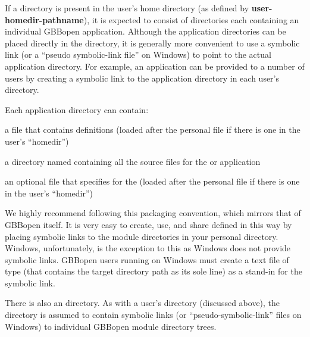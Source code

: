 \documentclass[10pt,twoside,english,pdftex]{article}
\begin{document}
If a  directory is present in the user's home directory
(as defined by \textbf{user-homedir-pathname}), it is expected to consist of
directories each containing an individual GBBopen application.  Although the
application directories can be placed directly in the 
directory, it is generally more convenient to use a symbolic link (or a
``pseudo symbolic-link file'' on Windows) to point to the actual application
directory.  For example, an application can be provided to a number of users
by creating a symbolic link to the application directory in each user's
 directory.

Each application directory can contain:
%
\begin{tightitemize}
\item a  file that contains  definitions
  (loaded after the personal  file if there is one in
  the user's ``homedir'')
\item a directory named  containing all the source files for the
   or application
\item an optional  file that specifies
   for the  (loaded after the personal
   file if there is one in the user's ``homedir'')
\end{tightitemize}

We highly recommend following this packaging convention, which mirrors that of
GBBopen itself. It is very easy to create, use, and share 
defined in this way by placing symbolic links to the module directories in
your personal  directory.  Windows, unfortunately, is
the exception to this as Windows does not provide symbolic links.  GBBopen
users running on Windows must create a text file of type  (that
contains the target directory path as its sole line) as a stand-in for the
symbolic link.

\label{sec:shared-gbbopen-modules-directory}

%
%
%
%
%
There is also an 
directory.  As with a user's  directory (discussed
above), the  directory is assumed to contain
symbolic links (or ``pseudo-symbolic-link'' files on Windows) to individual
GBBopen module directory trees.
\end{document}

